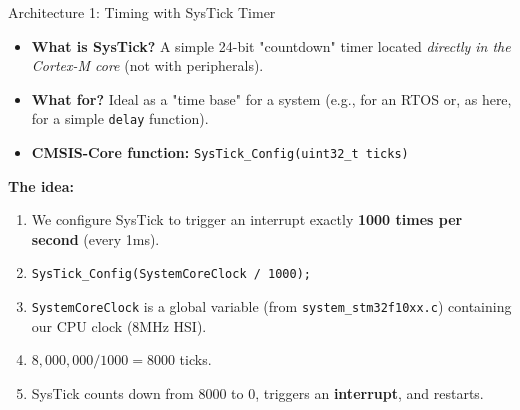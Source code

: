 \documentclass{beamer}
\begin{document}
\begin{frame}{Architecture 1: Timing with SysTick Timer}
	\begin{itemize}
		\item \textbf{What is SysTick?} A simple 24-bit "countdown" timer located \textit{directly in the Cortex-M core} (not with peripherals).
		\item \textbf{What for?} Ideal as a "time base" for a system (e.g., for an RTOS or, as here, for a simple \texttt{delay} function).
		\item \textbf{CMSIS-Core function:} \texttt{SysTick\_Config(uint32\_t ticks)}
	\end{itemize}
	
	\textbf{The idea:}
	\begin{enumerate}
		\item We configure SysTick to trigger an interrupt exactly \textbf{1000 times per second} (every 1ms).
		\item \texttt{SysTick\_Config(SystemCoreClock / 1000);}
		\item \texttt{SystemCoreClock} is a global variable (from \texttt{system\_stm32f10xx.c}) containing our CPU clock (8MHz HSI).
		\item $8,000,000 / 1000 = 8000$ ticks.
		\item SysTick counts down from 8000 to 0, triggers an \textbf{interrupt}, and restarts.
	\end{enumerate}
\end{frame}
\end{document}
